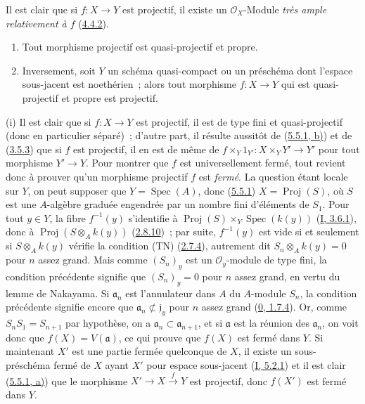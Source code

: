 Il est clair que si $f:X\to Y$ est projectif, il existe un
$\mathcal{O}_X$-Module \emph{très ample relativement à $f$}
(\hyperref[II.4.4.2-fr]{4.4.2}).

\begin{theorem}[5.5.3]
\label{II.5.5.3-fr}
\begin{enumerate}
  \item[\rm{(i)}] Tout morphisme projectif est quasi-projectif et propre.
  \item[\rm{(ii)}] Inversement, soit $Y$ un schéma quasi-compact ou un
  préschéma dont l'espace sous-jacent est noethérien~; alors tout morphisme
  $f:X\to Y$ qui est quasi-projectif et propre est projectif.
\end{enumerate}
\end{theorem}

(i) Il est clair que si $f:X\to Y$ est projectif, il est de type fini et
quasi-projectif (donc en particulier séparé)~; d'autre part, il résulte
aussitôt de (\hyperref[II.5.5.1-fr]{5.5.1, b)}) et de
(\hyperref[II.3.5.3-fr]{3.5.3}) que si $f$ est projectif, il en est de même de
$f\times_Y1_{Y'}:X\times_YY'\to Y'$ pour tout morphisme $Y'\to Y$. Pour
montrer que $f$ est universellement fermé, tout revient donc à prouver qu'un
morphisme projectif $f$ est \emph{fermé}. La question étant locale sur $Y$, on
peut supposer que $Y=\operatorname{Spec}(A)$, donc
(\hyperref[II.5.5.1-fr]{5.5.1}) $X=\operatorname{Proj}(S)$, où $S$ est une
$A$-algèbre graduée engendrée par un nombre fini d'éléments de $S_1$. Pour
tout $y\in Y$, la fibre $f^{-1}(y)$ s'identifie à
$\operatorname{Proj}(S)\times_Y\operatorname{Spec}(k(y))$
(\hyperref[I.3.6.1-fr]{I, 3.6.1}), donc à
$\operatorname{Proj}(S\otimes_Ak(y))$
(\hyperref[II.2.8.10-fr]{2.8.10})~; par suite, $f^{-1}(y)$ est vide si et
seulement si $S\otimes_Ak(y)$ vérifie la condition (TN)
(\hyperref[II.2.7.4-fr]{2.7.4}), autrement dit $S_n\otimes_Ak(y)=0$ pour $n$
assez grand. Mais comme $(S_n)_y$ est un $\mathcal{O}_y$-module de type fini,
la condition précédente signifie que $(S_n)_y=0$ pour $n$ assez grand, en
vertu du lemme de Nakayama. Si $\mathfrak a_n$ est l'annulateur dans $A$ du
$A$-module $S_n$, la condition précédente signifie encore que
$\mathfrak a_n\not\subset\mathfrak j_y$ pour $n$ assez grand
(\hyperref[0.1.7.4-fr]{0, 1.7.4}). Or, comme $S_nS_1=S_{n+1}$ par hypothèse,
on a $\mathfrak a_n\subset\mathfrak a_{n+1}$, et si $\mathfrak a$ est la
réunion des $\mathfrak a_n$, on voit donc que $f(X)=V(\mathfrak a)$, ce qui
prouve que $f(X)$ est fermé dans $Y$. Si maintenant $X'$ est une partie
fermée quelconque de $X$, il existe un sous-préschéma fermé de $X$ ayant $X'$
pour espace sous-jacent (\hyperref[I.5.2.1-fr]{I, 5.2.1}) et il est clair
(\hyperref[II.5.5.1-fr]{5.5.1, a)}) que le morphisme
$X'\to X\xrightarrow{f}Y$ est projectif, donc $f(X')$ est fermé dans $Y$.

